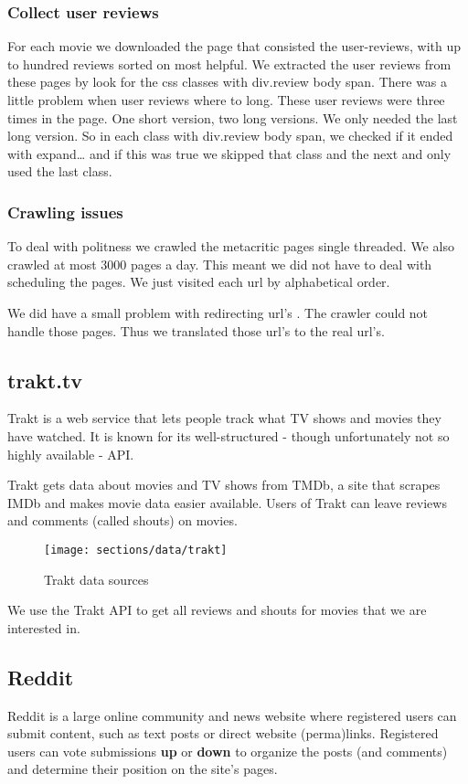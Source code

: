 \subsubsection{Collect user reviews}
For each movie we downloaded the page that consisted the user-reviews, with up to hundred reviews sorted on most helpful. 
We extracted the user reviews from these pages by look for the css classes with div.review body span. 
There was a little problem when user reviews where to long. These user reviews were three times in the page. One short version, two long versions. 
We only needed the last long version. So in each class with  div.review body span, 
we checked if it ended with expand… and if this was true we skipped that class and the next and only used the last class. 
\subsubsection{Crawling issues}
To deal with politness we crawled the metacritic pages single threaded. 
We also crawled at most 3000 pages a day. 
This meant we did not have to deal with scheduling the pages. 
We just visited each url by alphabetical order. 

We did have a small problem with redirecting url's . 
The crawler could not handle those pages. 
Thus we translated those url's to the real url's. 
\subsection{trakt.tv}
\label{sec:data:trakt}
Trakt is a web service that lets people track what TV shows and movies they have watched.
It is known for its well-structured - though unfortunately not so highly available - API.

Trakt gets data about movies and TV shows from TMDb, a site that scrapes IMDb and makes movie data easier available.
Users of Trakt can leave reviews and comments (called shouts) on movies.

\begin{figure}[H]
	\centering
	\texttt{[image: sections/data/trakt]}
	\caption{Trakt data sources}
\end{figure}

We use the Trakt API to get all reviews and shouts for movies that we are interested in.

\subsection{Reddit}
\label{sec:data:reddit}
Reddit is a large online community and news website where registered users can submit content, such as text posts or direct website (perma)links. 
Registered users can vote submissions \textbf{up} or \textbf{down} to organize the posts (and comments) and determine their position on the site's pages. 

